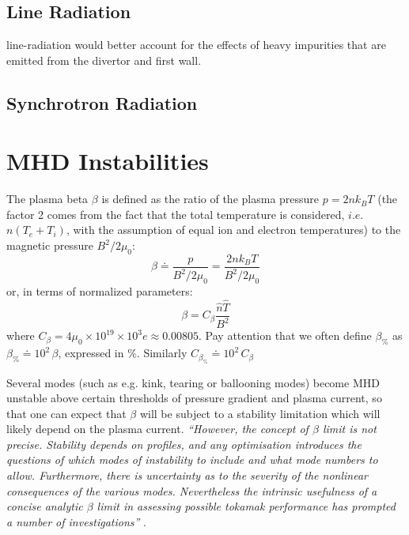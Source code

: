 \subsection{Line Radiation}
line-radiation would better account for the effects of heavy impurities that are emitted from the divertor and first wall.


\subsection{Synchrotron Radiation}



\section{MHD Instabilities}
The plasma beta $\beta$ is defined as the ratio of the plasma pressure $p=2nk_BT$ (the factor 2 comes from the fact that the total temperature is considered, $i.e.$ $n(T_e+T_i)$, with the assumption of equal ion and electron temperatures) to the magnetic pressure $B^2/2\mu_0$:
\begin{equation}
	\beta
	\doteq 
	\frac{p}{B^2/2\mu_0}
	=
	\frac{2 n k_B T}{B^2/2\mu_0}
\end{equation}
or, in terms of normalized parameters:
\begin{equation}
	\beta
	=
	C_\beta \frac{\hat n \hat T}{B^2}
\label{eqn:beta_adv}
\end{equation}
where $C_\beta = 4\mu_0\times 10^{19}\times 10^3 e \approx 0.00805$. Pay attention that we often define $\beta_\%$ as $\beta_\% \doteq 10^2\, \beta$,  expressed in $\%$. Similarly $C_{\beta_\%} \doteq 10^2\, C_{\beta}$


Several modes (such as e.g. kink, tearing or ballooning modes) become MHD unstable above certain thresholds of pressure gradient and plasma current, so that one can expect that $\beta$ will be subject to a stability limitation which will likely depend on the plasma current. \emph{``However, the concept of $\beta$ limit is not precise. Stability depends on profiles, and any optimisation introduces the questions of which modes of instability to include and what mode numbers to allow. Furthermore, there is uncertainty as to the severity of the nonlinear consequences of the various modes. Nevertheless the intrinsic usefulness of a concise analytic $\beta$ limit in assessing possible tokamak performance has prompted a number of investigations''} .

